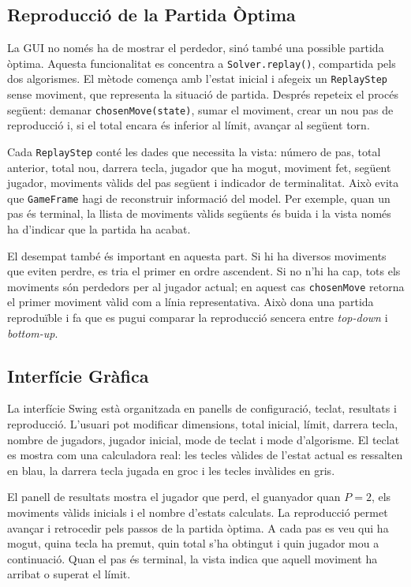\documentclass[conference,compsoc]{IEEEtran}
\begin{document}
\subsection{Reproducció de la Partida Òptima}

La GUI no només ha de mostrar el perdedor, sinó també una possible partida
òptima. Aquesta funcionalitat es concentra a \texttt{Solver.replay()}, compartida
pels dos algorismes. El mètode comença amb l'estat inicial i afegeix un
\texttt{ReplayStep} sense moviment, que representa la situació de partida. Després
repeteix el procés següent: demanar \texttt{chosenMove(state)}, sumar el moviment,
crear un nou pas de reproducció i, si el total encara és inferior al límit, avançar al
següent torn.

Cada \texttt{ReplayStep} conté les dades que necessita la vista: número de pas,
total anterior, total nou, darrera tecla, jugador que ha mogut, moviment fet,
següent jugador, moviments vàlids del pas següent i indicador de terminalitat.
Això evita que \texttt{GameFrame} hagi de reconstruir informació del model. Per
exemple, quan un pas és terminal, la llista de moviments vàlids següents és buida
i la vista només ha d'indicar que la partida ha acabat.

El desempat també és important en aquesta part. Si hi ha diversos moviments que
eviten perdre, es tria el primer en ordre ascendent. Si no n'hi ha cap, tots els
moviments són perdedors per al jugador actual; en aquest cas \texttt{chosenMove}
retorna el primer moviment vàlid com a línia representativa. Això dona una
partida reproduïble i fa que es pugui comparar la reproducció sencera entre
\textit{top-down} i \textit{bottom-up}.

\subsection{Interfície Gràfica}

La interfície Swing \cite{ref_gfg_swing} està organitzada en panells de configuració,
teclat, resultats i reproducció. L'usuari pot modificar dimensions, total inicial,
límit, darrera tecla, nombre de jugadors, jugador inicial, mode de teclat i mode
d'algorisme. El teclat es mostra com una calculadora real: les tecles vàlides de
l'estat actual es ressalten en blau, la darrera tecla jugada en groc i les tecles
invàlides en gris.

El panell de resultats mostra el jugador que perd, el guanyador quan $P=2$, els
moviments vàlids inicials i el nombre d'estats calculats. La reproducció permet
avançar i retrocedir pels passos de la partida òptima. A cada pas es veu qui ha
mogut, quina tecla ha premut, quin total s'ha obtingut i quin jugador mou a
continuació. Quan el pas és terminal, la vista indica que aquell moviment ha
arribat o superat el límit.
\end{document}
